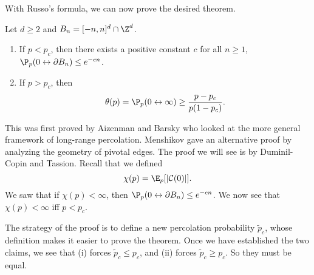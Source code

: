 \documentclass[a4paper]{article}
\begin{document}
With Russo's formula, we can now prove the desired theorem.
\begin{thm}
  Let $d \geq 2$ and $B_n = [-n, n]^d \cap \Z^d$.
  \begin{enumerate}
    \item If $p < p_c$, then there exists a positive constant $c$ for all $n \geq 1$, $\P_p(0 \leftrightarrow \partial B_n) \leq e^{-cn}$.
    \item If $p > p_c$, then
      \[
        \theta(p) = \P_p(0 \leftrightarrow \infty) \geq \frac{p - p_c}{p(1 - p_c)}.
      \]
  \end{enumerate}
\end{thm}
This was first proved by Aizenman and Barsky who looked at the more general framework of long-range percolation. Menshikov gave an alternative proof by analyzing the geometry of pivotal edges. The proof we will see is by Duminil-Copin and Tassion. Recall that we defined
\[
  \chi(p) = \E_p[|\mathcal{C}(0)|].
\]
We saw that if $\chi(p) < \infty$, then $\P_p(0 \leftrightarrow \partial B_n) \leq e^{-cn}$. We now see that $\chi(p) < \infty$ iff $p < p_c$.

The strategy of the proof is to define a new percolation probability $\tilde{p}_c$, whose definition makes it easier to prove the theorem. Once we have established the two claims, we see that (i) forces $\tilde{p}_c \leq p_c$, and (ii) forces $\tilde{p}_c \geq p_c$. So they must be equal.
\end{document}
